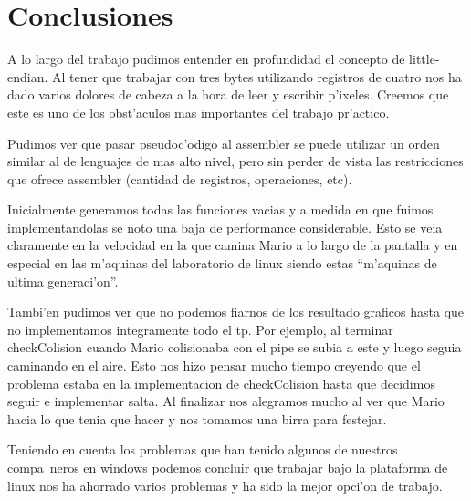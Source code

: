 \section{Conclusiones}
A lo largo del trabajo pudimos entender en profundidad el concepto de little-endian. Al tener que trabajar con tres bytes utilizando registros de cuatro nos ha dado varios dolores de cabeza a la hora de leer y escribir p'ixeles. 
Creemos que este es uno de los obst'aculos mas importantes del trabajo pr'actico.

Pudimos ver que pasar pseudoc'odigo al assembler se puede utilizar un orden similar al de lenguajes de mas alto nivel, pero sin perder de vista las restricciones que ofrece assembler (cantidad de registros, operaciones, etc).

Inicialmente generamos todas las funciones vacias y a medida en que fuimos implementandolas se noto una baja de performance considerable. Esto se veia claramente en la velocidad en la que camina Mario a lo largo de la pantalla y en especial en las m'aquinas del laboratorio de linux siendo estas ``m'aquinas de ultima generaci'on''.

Tambi'en pudimos ver que no podemos fiarnos de los resultado graficos hasta que no implementamos integramente todo el tp. Por ejemplo, al terminar checkColision cuando Mario colisionaba con el pipe se subia a este y luego seguia caminando en el aire. Esto nos hizo pensar mucho tiempo creyendo que el problema estaba en la implementacion de checkColision hasta que decidimos seguir e implementar salta. Al finalizar nos alegramos mucho al ver que Mario hacia lo que tenia que hacer y nos tomamos una birra para festejar.

Teniendo en cuenta los problemas que han tenido algunos de nuestros compa~neros en windows podemos concluir que trabajar bajo la plataforma de linux nos ha ahorrado varios problemas y ha sido la mejor opci'on de trabajo.

